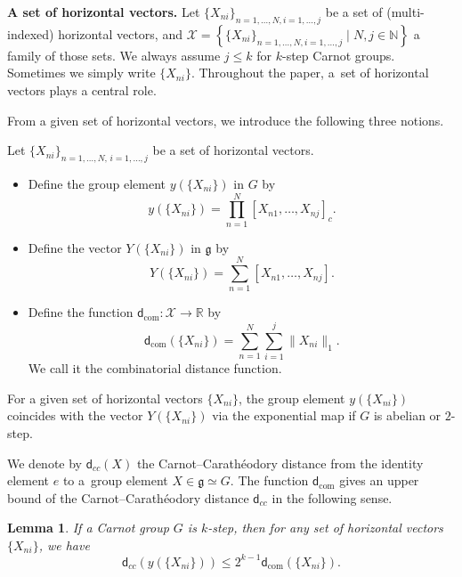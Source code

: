 \documentclass[10pt,a4paper]{amsart}
\numberwithin{equation}{section}
\newtheorem{Lemma}[Theorem]{Lemma}
\newcommand{\g}{\mathfrak{g}}
\newcommand{\R}{\mathbb{R}}
\newcommand{\N}{\mathbb{N}}
\begin{document}
{\bf A set of horizontal vectors.}
Let $\{X_{ni}\}_{n=1,\dots,N,i=1,\dots,j}$ be a set of (multi-indexed) horizontal vectors,
and $\mathcal{X}=\left\{\{X_{ni}\}_{n=1,\dots,N,i=1,\dots,j}\mid N,j\in\N\right\}$ a family of those sets.
We always assume $j\leq k$ for $k$-step Carnot groups.
Sometimes we simply write $\{X_{ni}\}$.
Throughout the paper,
a~set of horizontal vectors plays a central role.

From a given set of horizontal vectors,
we introduce the following three notions.

\begin{Definition}
 Let $\{X_{ni}\}_{n=1,\dots,N,\,i=1,\dots,j}$ be a set of horizontal vectors.
\begin{itemize}\itemsep=0pt
 \item[$1.$] Define the group element $y(\{X_{ni}\})$ in $G$ by
 \[
 y(\{X_{ni}\})=\prod_{n=1}^N [X_{n1},\dots,X_{nj}]_c.
 \]

 \item[$2.$] Define the vector $Y(\{X_{ni}\})$ in $\g$ by
 \[
 Y(\{X_{ni}\})=\sum_{n=1}^N[X_{n1},\dots,X_{nj}].
 \]
 \item[$3.$] Define the function $\mathsf{d}_{\mathrm{com}}\colon \mathcal{X}\to\R$ by
 \[
 \mathsf{d}_{\mathrm{com}}(\{X_{ni}\})=\sum_{n=1}^N\sum_{i=1}^j\|X_{ni}\|_1.
 \]
 We call it the combinatorial distance function.
\end{itemize}
\end{Definition}

\begin{Remark}\label{rmk2step}
 For a given set of horizontal vectors $\{X_{ni}\}$,
the group element $y(\{X_{ni}\})$ coincides with the vector $Y(\{X_{ni}\})$ via the exponential map if $G$ is abelian or $2$-step.
\end{Remark}

We denote by $\mathsf{d}_{cc}(X)$ the Carnot--Carath\'eodory distance from the identity element $e$ to a~group element $X\in\g\simeq G$.
The function $\mathsf{d}_{\mathrm{com}}$ gives an upper bound of the Carnot--Carath\'eodory distance $\mathsf{d}_{cc}$ in the following sense.
\begin{Lemma}\label{lemcom}
If a Carnot group $G$ is $k$-step,
then for any set of horizontal vectors $\{X_{ni}\}$,
we have
\[
\mathsf{d}_{cc}(y(\{X_{ni}\}))\leq 2^{k-1}\mathsf{d}_{\mathrm{com}}(\{X_{ni}\}).
\]
\end{Lemma}
\end{document}
